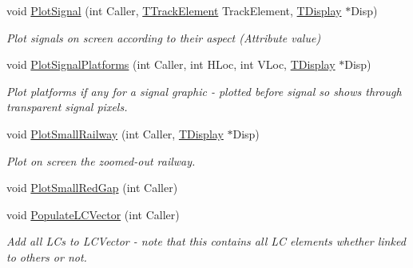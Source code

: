 \begin{DoxyCompactItemize}
\item 
\mbox{\label{class_t_track_aa5742fbc2eb3f8743dde84005499f89e}} 
void \mbox{\hyperlink{class_t_track_aa5742fbc2eb3f8743dde84005499f89e}{Plot\+Signal}} (int Caller, \mbox{\hyperlink{class_t_track_element}{T\+Track\+Element}} Track\+Element, \mbox{\hyperlink{class_t_display}{T\+Display}} $\ast$Disp)
\begin{DoxyCompactList}\small\item\em Plot signals on screen according to their aspect (Attribute value) \end{DoxyCompactList}\item 
\mbox{\label{class_t_track_a2830b22db25712a80fa55b1546b5df9b}} 
void \mbox{\hyperlink{class_t_track_a2830b22db25712a80fa55b1546b5df9b}{Plot\+Signal\+Platforms}} (int Caller, int H\+Loc, int V\+Loc, \mbox{\hyperlink{class_t_display}{T\+Display}} $\ast$Disp)
\begin{DoxyCompactList}\small\item\em Plot platforms if any for a signal graphic -\/ plotted before signal so shows through transparent signal pixels. \end{DoxyCompactList}\item 
\mbox{\label{class_t_track_af654985aa4d1c17684f91474fa03ed98}} 
void \mbox{\hyperlink{class_t_track_af654985aa4d1c17684f91474fa03ed98}{Plot\+Small\+Railway}} (int Caller, \mbox{\hyperlink{class_t_display}{T\+Display}} $\ast$Disp)
\begin{DoxyCompactList}\small\item\em Plot on screen the zoomed-\/out railway. \end{DoxyCompactList}\item 
void \mbox{\hyperlink{class_t_track_ab831c2f47850f3a89678491475d52d29}{Plot\+Small\+Red\+Gap}} (int Caller)
\item 
\mbox{\label{class_t_track_a9a476cd9b32a351de87591f3db2ddb99}} 
void \mbox{\hyperlink{class_t_track_a9a476cd9b32a351de87591f3db2ddb99}{Populate\+L\+C\+Vector}} (int Caller)
\begin{DoxyCompactList}\small\item\em Add all L\+Cs to L\+C\+Vector -\/ note that this contains all LC elements whether linked to others or not. \end{DoxyCompactList}\item 

\end{DoxyCompactItemize}
